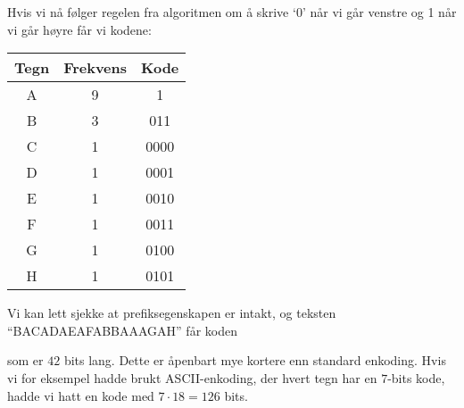 \begin{example}
	Hvis vi nå følger regelen fra algoritmen om å skrive `0' når vi går venstre og 1 når vi går høyre får vi kodene:
	\begin{center}
		\begin{tabular}{c c c}
			Tegn & Frekvens & Kode \\
			\hline
			A & 9 & 1\\
			B & 3 & 011\\
			C & 1 & 0000\\
			D & 1 & 0001\\
			E & 1 & 0010\\
			F & 1 & 0011\\
			G & 1 & 0100\\
			H & 1 & 0101
		\end{tabular}
	\end{center}
	Vi kan lett sjekke at prefiksegenskapen er intakt, og teksten ``BACADAEAFABBAAAGAH'' får koden
	\begin{center}
	\end{center}
	som er $ 42 $ bits lang. Dette er åpenbart mye kortere enn standard enkoding. Hvis vi for eksempel hadde brukt ASCII-enkoding, der hvert tegn har en $ 7 $-bits kode, hadde vi hatt en kode med $7\cdot18 = 126$ bits.
\end{example}